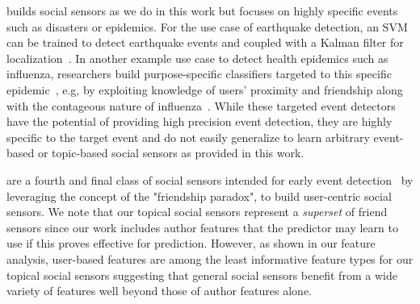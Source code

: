 \vspace{2mm}
 builds social sensors
as we do in this work but focuses on highly specific events 
such as disasters or epidemics.  For the use case of earthquake
detection, an SVM can be trained to detect earthquake events
and coupled with a Kalman filter for localization~\cite{sakakiEq2}.
%
%
%
In another example use case to detect health epidemics such as
influenza, researchers build purpose-specific classifiers targeted to
this specific epidemic~\cite{culotta,aramaki}, e.g, by exploiting
knowledge of users' proximity and friendship along with the contageous
nature of influenza~\cite{sadilek}.  While these targeted event
detectors have the potential of providing high precision event
detection, they are highly specific to the target event and do not
easily generalize to learn arbitrary event-based or topic-based social
sensors as provided in this work.

\vspace{2mm}
are a fourth and final class of social sensors intended for early
event detection~\cite{sandy,garcia} by leveraging the concept of the
"friendship paradox"\cite{feld}, %
to build user-centric social sensors.  We note that our topical social
sensors represent a \emph{superset} of friend sensors since our work
includes author features that the predictor may learn to use if this
proves effective for prediction.  However, as shown in our feature
analysis, user-based features are among the least informative feature
types for our topical social sensors suggesting that general social
sensors benefit from a wide variety of features well beyond those of
author features alone.

